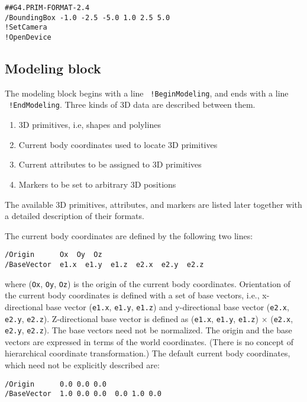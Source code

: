 \begin{verbatim}
##G4.PRIM-FORMAT-2.4
/BoundingBox -1.0 -2.5 -5.0 1.0 2.5 5.0
!SetCamera
!OpenDevice
\end{verbatim}

\subsection{Modeling block}  

The modeling block begins with a line \ \verb+!BeginModeling+,   
and ends with a line                  \ \verb+!EndModeling+.
Three kinds of 3D data are described between them.

\noindent  
\begin{enumerate}
\item 3D primitives, i.e, shapes and polylines
\item Current body coordinates used to locate 3D primitives
\item Current attributes to be assigned to 3D primitives
\item Markers to be set to arbitrary 3D positions
\end{enumerate}

\noindent
The available 3D primitives, attributes, and markers  
are listed later together with a detailed description of  
their formats.

The current body coordinates are defined by the following two 
lines:

\begin{verbatim}
/Origin      Ox  Oy  Oz
/BaseVector  e1.x  e1.y  e1.z  e2.x  e2.y  e2.z  
\end{verbatim}

\noindent
where (\verb+Ox+, \verb+Oy+, \verb+Oz+) is the origin of   
the current body coordinates.  
Orientation of the current body coordinates is defined with  
a set of base vectors, i.e.,  
x-directional base vector (\verb+e1.x+, \verb+e1.y+, \verb+e1.z+)  
and y-directional base vector (\verb+e2.x+, \verb+e2.y+, \verb+e2.z+).
Z-directional base vector is defined as  
(\verb+e1.x+, \verb+e1.y+, \verb+e1.z+) $\times$  
(\verb+e2.x+, \verb+e2.y+, \verb+e2.z+).  
The base vectors need not be normalized.  
The origin and the base vectors are expressed in terms of the world
coordinates.  
(There is no concept of hierarchical coordinate transformation.)
The default current body coordinates, which need not be
explicitly described are:

\begin{verbatim}
/Origin      0.0 0.0 0.0  
/BaseVector  1.0 0.0 0.0  0.0 1.0 0.0   
\end{verbatim}


